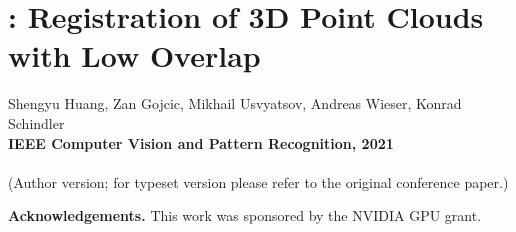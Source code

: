 \chapter[\acro: Registration of 3D Point Clouds with Low Overlap]{\acro: Registration of 3D Point Clouds with Low Overlap}
\label{chap:cvpr21}

Shengyu Huang, Zan Gojcic, Mikhail Usvyatsov, Andreas Wieser, Konrad Schindler\\
\textbf{IEEE Computer Vision and Pattern Recognition, 2021}\\
\\
(Author version; for typeset version please refer to the original conference paper.)\\

\providecommand{\subdir}{.}
\graphicspath{{\subdir/}}


\newpage






\noindent\textbf{Acknowledgements.}
{This work was sponsored by the NVIDIA GPU grant.}
\newpage

